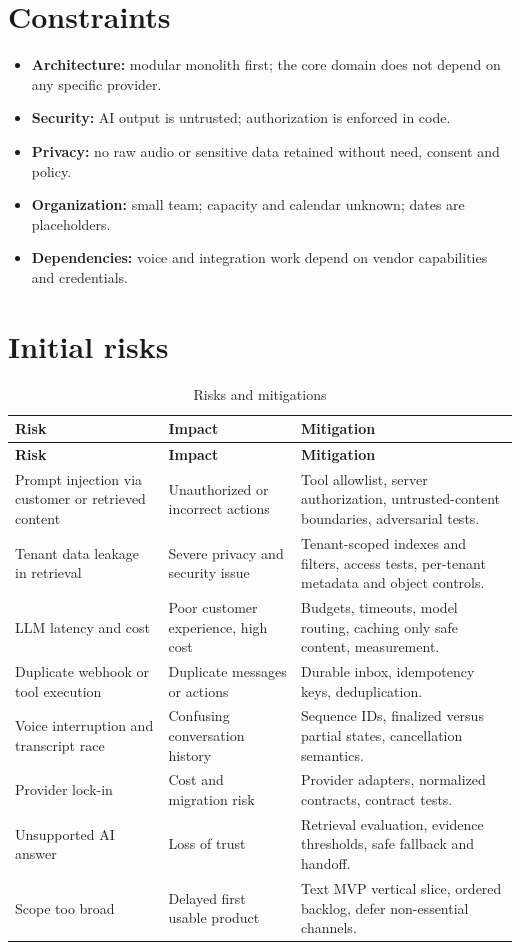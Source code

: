 \section{Constraints}
\begin{itemize}
  \item \textbf{Architecture:} modular monolith first; the core domain does not depend on any specific provider.
  \item \textbf{Security:} AI output is untrusted; authorization is enforced in code.
  \item \textbf{Privacy:} no raw audio or sensitive data retained without need, consent and policy.
  \item \textbf{Organization:} small team; capacity and calendar unknown; dates are placeholders.
  \item \textbf{Dependencies:} voice and integration work depend on vendor capabilities and credentials.
\end{itemize}

\section{Initial risks}
\begin{longtable}{@{}p{3.6cm}p{3.7cm}p{8.7cm}@{}}
\caption{Risks and mitigations}\label{tab:risks}\\
\toprule \textbf{Risk} & \textbf{Impact} & \textbf{Mitigation} \\ \midrule \endfirsthead
\toprule \textbf{Risk} & \textbf{Impact} & \textbf{Mitigation} \\ \midrule \endhead
\bottomrule \endlastfoot
Prompt injection via customer or retrieved content & Unauthorized or incorrect actions & Tool allowlist, server authorization, untrusted-content boundaries, adversarial tests. \\
Tenant data leakage in retrieval & Severe privacy and security issue & Tenant-scoped indexes and filters, access tests, per-tenant metadata and object controls. \\
LLM latency and cost & Poor customer experience, high cost & Budgets, timeouts, model routing, caching only safe content, measurement. \\
Duplicate webhook or tool execution & Duplicate messages or actions & Durable inbox, idempotency keys, deduplication. \\
Voice interruption and transcript race & Confusing conversation history & Sequence IDs, finalized versus partial states, cancellation semantics. \\
Provider lock-in & Cost and migration risk & Provider adapters, normalized contracts, contract tests. \\
Unsupported AI answer & Loss of trust & Retrieval evaluation, evidence thresholds, safe fallback and handoff. \\
Scope too broad & Delayed first usable product & Text MVP vertical slice, ordered backlog, defer non-essential channels. \\
\end{longtable}


